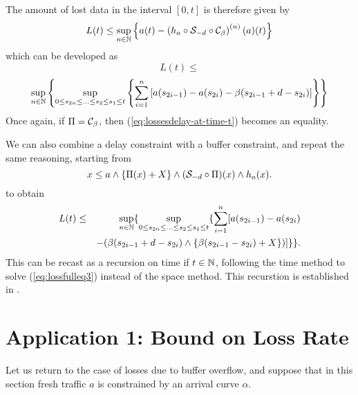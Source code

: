 The amount of lost data in the interval $[0,t]$ is therefore given by
$$L(t)  \leq  \sup_{n \in \mathbb{N}} \left\{ a(t) - \left( h_{a} \circ
\mathcal S_{-d} \circ \mathcal C_{\beta} \right)^{(n)}(a)(t) \right\} $$ %
which can be developed as
$$  L(t) \leq $$
\begin{equation}
\sup_{n \in \Nats}  \left\{ \sup_{0 \leq s_{2n} \leq \ldots \leq
s_2 \leq s_1 \leq t}
  \left\{
  \sum_{i=1}^n \left[ a(s_{2i-1}) - a(s_{2i}) -
\beta(s_{2i-1}+d-s_{2i}) \right] \right\} \right\}
\mylabel{eq:lossesdelay-at-time-t}
\end{equation}
Once again, if $\Pi = \mathcal C_{\beta}$, then (\ref{eq:lossesdelay-at-time-t}) becomes an equality.

We can also combine a delay constraint with a buffer constraint, and repeat
the same reasoning, starting from
\begin{equation}
\mylabel{eq:lossfulleq3}
x \leq a \wedge \left\{ \Pi(x) + X \right\} \wedge (\calS_{-d} \circ \Pi)(x)  \wedge h_{a}(x).
\end{equation}
to obtain
\begin{eqnarray}
\mylabel{eq:lossesdelaybuffer-at-time-t}
L(t) & \leq & \sup_{n \in \Nats}  \{ \sup_{0 \leq s_{2n} \leq \ldots
\leq s_2 \leq s_1 \leq t}
  \{ \sum_{i=1}^n [ a(s_{2i-1}) - a(s_{2i})  \nonumber \\
      & &  - (\beta(s_{2i-1}+d-s_{2i}) \wedge \{ \beta(s_{2i-1}-s_{2i}) + X \})] \} \}.
\end{eqnarray}
This can be recast as a recursion on time if $t \in \mathbb{N}$, following the time method to solve (\ref{eq:lossfulleq3}) instead of the space method. This recurstion is established in \cite{CCLBT}.

\section{Application 1: Bound on Loss Rate}

Let us return to the case of losses due to buffer overflow,
and suppose that in this section fresh  traffic $a$ is constrained by an arrival
curve $\alpha$. %

